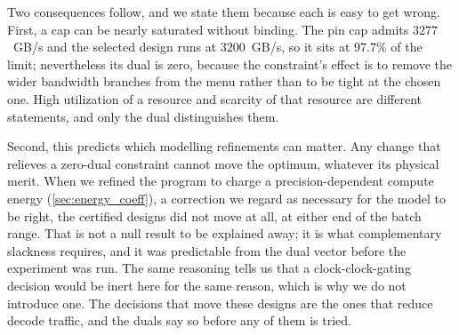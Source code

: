 Two consequences follow, and we state them because each is easy to get wrong.
First, a cap can be nearly saturated without binding. The pin cap admits
$3277$~GB/s and the selected design runs at $3200$~GB/s, so it sits at $97.7\%$
of the limit; nevertheless its dual is zero, because the constraint's effect is
to remove the wider bandwidth branches from the menu rather than to be tight at
the chosen one. High utilization of a resource and scarcity of that resource are
different statements, and only the dual distinguishes them.

Second, this predicts which modelling refinements can matter. Any change that
relieves a zero-dual constraint cannot move the optimum, whatever its
physical merit. When we refined the program to charge a precision-dependent
compute energy (\cref{sec:energy_coeff}), a correction we regard as necessary
for the model to be right, the certified designs did not move at all, at either
end of the batch range. That is not a null result to be explained away; it is
what complementary slackness requires, and it was predictable from the dual
vector before the experiment was run. The same reasoning tells us that a
clock-clock-gating decision would be inert here for the same reason, which is why we do
not introduce one. The decisions that move these designs are the ones that reduce
decode traffic, and the duals say so before any of them is tried.

